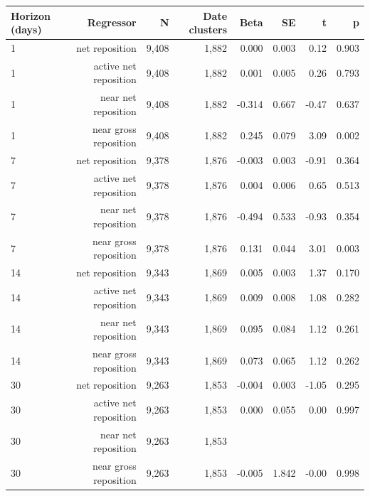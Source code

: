 \begin{tabular}{lrrrrrrr}
\toprule
Horizon (days) & Regressor & N & Date clusters & Beta & SE & t & p \\
\midrule
1 & net reposition & 9,408 & 1,882 & 0.000 & 0.003 & 0.12 & 0.903 \\
1 & active net reposition & 9,408 & 1,882 & 0.001 & 0.005 & 0.26 & 0.793 \\
1 & near net reposition & 9,408 & 1,882 & -0.314 & 0.667 & -0.47 & 0.637 \\
1 & near gross reposition & 9,408 & 1,882 & 0.245 & 0.079 & 3.09 & 0.002 \\
7 & net reposition & 9,378 & 1,876 & -0.003 & 0.003 & -0.91 & 0.364 \\
7 & active net reposition & 9,378 & 1,876 & 0.004 & 0.006 & 0.65 & 0.513 \\
7 & near net reposition & 9,378 & 1,876 & -0.494 & 0.533 & -0.93 & 0.354 \\
7 & near gross reposition & 9,378 & 1,876 & 0.131 & 0.044 & 3.01 & 0.003 \\
14 & net reposition & 9,343 & 1,869 & 0.005 & 0.003 & 1.37 & 0.170 \\
14 & active net reposition & 9,343 & 1,869 & 0.009 & 0.008 & 1.08 & 0.282 \\
14 & near net reposition & 9,343 & 1,869 & 0.095 & 0.084 & 1.12 & 0.261 \\
14 & near gross reposition & 9,343 & 1,869 & 0.073 & 0.065 & 1.12 & 0.262 \\
30 & net reposition & 9,263 & 1,853 & -0.004 & 0.003 & -1.05 & 0.295 \\
30 & active net reposition & 9,263 & 1,853 & 0.000 & 0.055 & 0.00 & 0.997 \\
30 & near net reposition & 9,263 & 1,853 &  &  &  &  \\
30 & near gross reposition & 9,263 & 1,853 & -0.005 & 1.842 & -0.00 & 0.998 \\
\bottomrule
\end{tabular}
